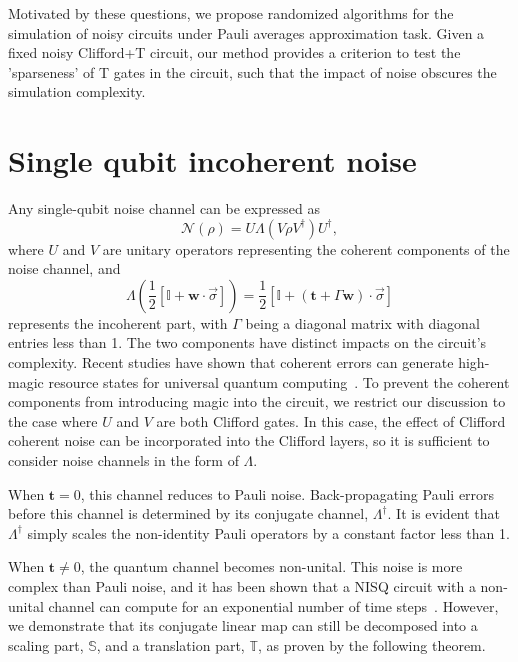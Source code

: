\documentclass[aps,%
twocolumn,%
floatfix,%
pra,%
amsfonts,%
longbibliography,%
groupedaddress,%
superscriptaddress]{revtex4-2}%
\newcommand{\1}{\mathbbm{1}}
\begin{document}
Motivated by these questions, we propose randomized algorithms for the simulation of noisy circuits under Pauli averages approximation task. Given a fixed noisy Clifford+T circuit, our method provides a criterion to test the 'sparseness' of T gates in the circuit, such that the impact of noise obscures the simulation complexity.  
\section{ Single qubit incoherent noise}
Any single-qubit noise channel can be expressed as~\cite{king2001minimal}
\[
\mathcal{N}(\rho) = U \Lambda(V \rho V^\dagger) U^\dagger,
\]
where \( U \) and \( V \) are unitary operators representing the coherent components of the noise channel, and
\[
\Lambda\left(\frac{1}{2}[\mathbb{I} + \mathbf{w} \cdot \vec \sigma]\right) = \frac{1}{2}[\mathbb{I} + (\mathbf{t} + \Gamma \mathbf{w}) \cdot \vec\sigma]
\]
represents the incoherent part, with \( \Gamma \) being a diagonal matrix with diagonal entries less than 1. The two components have distinct impacts on the circuit's complexity. Recent studies have shown that coherent errors can generate high-magic resource states for universal quantum computing~\cite{niroula2024phase,turkeshi2024coherent}. To prevent the coherent components from introducing magic into the circuit, we restrict our discussion to the case where \( U \) and \( V \) are both Clifford gates. In this case, the effect of Clifford coherent noise can be incorporated into the Clifford layers, so it is sufficient to consider noise channels in the form of \( \Lambda \).

When \( \mathbf{t} = 0 \), this channel reduces to Pauli noise. Back-propagating Pauli errors before this channel is determined by its conjugate channel, \( \Lambda^\dagger \). It is evident that \( \Lambda^\dagger \) simply scales the non-identity Pauli operators by a constant factor less than 1.

When \( \mathbf{t} \neq 0 \), the quantum channel becomes non-unital. This noise is more complex than Pauli noise, and it has been shown that a NISQ circuit with a non-unital channel can compute for an exponential number of time steps~\cite{ben2013quantum}. However, we demonstrate that its conjugate linear map can still be decomposed into a scaling part, \( \mathbb{S} \), and a translation part, \( \mathbb{T} \), as proven by the following theorem.
\end{document}
